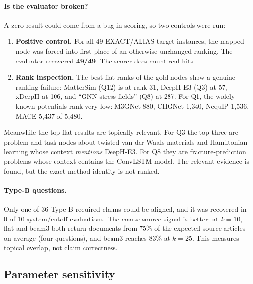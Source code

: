 \documentclass[11pt,a4paper]{article}
\theoremstyle{remark}
\begin{document}
\paragraph{Is the evaluator broken?}
A zero result could come from a bug in scoring, so two controls were run:
\begin{enumerate}
  \item \textbf{Positive control.} For all 49 EXACT/ALIAS target instances, the mapped node
        was forced into first place of an otherwise unchanged ranking. The evaluator recovered
        \textbf{49/49}. The scorer does count real hits.
  \item \textbf{Rank inspection.} The best flat ranks of the gold nodes show a genuine ranking
        failure: MatterSim (Q12) is at rank 31, DeepH-E3 (Q3) at 57, xDeepH at 106, and
        ``GNN stress fields'' (Q8) at 287. For Q1, the widely known potentials rank very low:
        M3GNet 880, CHGNet 1{,}340, NequIP 1{,}536, MACE 5{,}437 of 5{,}480.
\end{enumerate}
Meanwhile the top flat results are topically relevant. For Q3 the top three are problem
and task nodes about twisted van der Waals materials and Hamiltonian learning whose context
\emph{mentions} DeepH-E3. For Q8 they are fracture-prediction problems whose context contains
the ConvLSTM model. The relevant evidence is found, but the exact method identity is not
ranked.

\paragraph{Type-B questions.}
Only one of 36 Type-B required claims could be aligned, and it was recovered in 0 of 10
system/cutoff evaluations. The coarse source signal is better: at $k=10$, flat and beam3 both
return documents from 75\% of the expected source articles on average (four questions), and
beam3 reaches 83\% at $k=25$. This measures topical overlap, not claim correctness.

\subsection{Parameter sensitivity}
\label{sec:sens}
\end{document}
